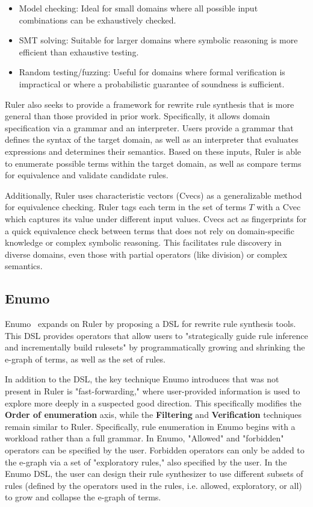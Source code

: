 \documentclass[acmsmall,screen,nonacm]{acmart}
\begin{document}
\begin{itemize}
    \item Model checking: Ideal for small domains where all possible input combinations can be exhaustively checked.

    \item SMT solving: Suitable for larger domains where symbolic reasoning is more efficient than exhaustive testing.

    \item Random testing/fuzzing: Useful for domains where formal verification is impractical or where a probabilistic guarantee of soundness is sufficient.
\end{itemize}

Ruler also seeks to provide a framework for rewrite rule synthesis that is more general than those provided in prior work. Specifically, it allows domain specification via a grammar and an interpreter. Users provide a grammar that defines the syntax of the target domain, as well as an interpreter that evaluates expressions and determines their semantics. Based on these inputs, Ruler is able to enumerate possible terms within the target domain, as well as compare terms for equivalence and validate candidate rules.

Additionally, Ruler uses characteristic vectors (Cvecs) as a generalizable method for equivalence checking. Ruler tags each term in the set of terms $T$ with a Cvec which captures its value under different input values. Cvecs act as fingerprints for a quick equivalence check between terms that does not rely on domain-specific knowledge or complex symbolic reasoning. This facilitates rule discovery in diverse domains, even those with partial operators (like division) or complex semantics.

\subsection{Enumo}
Enumo~\cite{pal2023enumo} expands on Ruler by proposing a DSL for rewrite rule synthesis tools. This DSL provides operators that allow users to "strategically guide rule inference and incrementally build rulesets" by programmatically growing and shrinking the e-graph of terms, as well as the set of rules. 

In addition to the DSL, the key technique Enumo introduces that was not present in Ruler is "fast-forwarding," where user-provided information is used to explore more deeply in a suspected good direction. This specifically modifies the \textbf{Order of enumeration} axis, while the \textbf{Filtering} and \textbf{Verification} techniques remain similar to Ruler. Specifically, rule enumeration in Enumo begins with a workload rather than a full grammar. In Enumo, "Allowed" and "forbidden" operators can be specified by the user. Forbidden operators can only be added to the e-graph via a set of "exploratory rules," also specified by the user. In the Enumo DSL, the user can design their rule synthesizer to use different subsets of rules (defined by the operators used in the rules, i.e. allowed, exploratory, or all) to grow and collapse the e-graph of terms.
\end{document}
